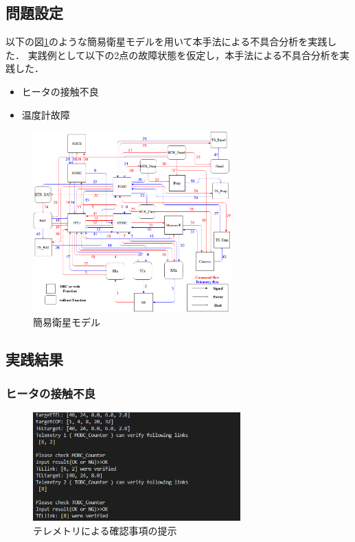 \documentclass[11pt]{jsarticle}%
\begin{document}
\begin{multicols}{2}
  \subsection{問題設定}
  \vspace{-1zh}
  以下の図\ref{fig:satellite}のような簡易衛星モデルを用いて本手法による不具合分析を実践した．
  実践例として以下の2点の故障状態を仮定し，本手法による不具合分析を実践した．
 \begin{itemize}
   \item ヒータの接触不良
   \item 温度計故障
 \end{itemize}
  \begin{figure}[H]
    \centering
      \includegraphics[height=7.0cm]{../figure/satellite_diagram.png}
      \caption{簡易衛星モデル}
      \label{fig:satellite}
  \end{figure}
  

  \vspace{-1zh}
  \subsection{実践結果}
  \vspace{-1zh}
  \subsubsection{ヒータの接触不良}
  \vspace{-1zh}

  \begin{figure}[H]
    \centering
      \includegraphics[width=8.0cm]{../figure/COM14_TEL17_show_TEL_list.png}
      \caption{テレメトリによる確認事項の提示}
      \label{fig:TEL_list}
  \end{figure}


\end{multicols}
\end{document}
